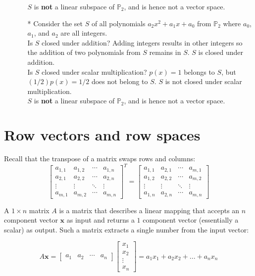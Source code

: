\documentclass{article}
\begin{document}
\begin{itemize}
\begin{itemize}
\(S\) is {\bf not} a linear subspace of \(\mathbb{P}_2\), and is hence not a vector space. 
\item[*] Consider the set \(S\) of all polynomials \(a_2 x^2 + a_1 x + a_0\) from \(\mathbb{P}_2\) where \(a_0\), \(a_1\), and \(a_2\) are all integers. \\
Is \(S\) closed under addition? Adding integers results in other integers so the addition of two polynomials from \(S\) remains in \(S\). \(S\) is closed under addition. \\
Is \(S\) closed under scalar multiplication? \(p(x) = 1\) belongs to \(S\), but \((1/2)p(x) = 1/2\) does not belong to \(S\). \(S\) is not closed under scalar multiplication. \\
\(S\) is {\bf not} a linear subspace of \(\mathbb{P}_2\), and is hence not a vector space. 
\end{itemize}
\end{itemize}




\section*{Row vectors and row spaces}

Recall that the transpose of a matrix swaps rows and columns: 
\[\begin{bmatrix}
a_{1,1} & a_{1,2} & \cdots & a_{1,n} \\
a_{2,1} & a_{2,2} & \cdots & a_{2,n} \\
\vdots & \vdots & \ddots & \vdots \\
a_{m,1} & a_{m,2} & \cdots & a_{m,n} 
\end{bmatrix}^T = \begin{bmatrix}
a_{1,1} & a_{2,1} & \cdots & a_{m,1} \\
a_{1,2} & a_{2,2} & \cdots & a_{m,2} \\
\vdots & \vdots & \ddots & \vdots \\
a_{1,n} & a_{2,n} & \cdots & a_{m,n} 
\end{bmatrix}\]

A \(1 \times n\) matrix \(A\) is a matrix that describes a linear mapping that accepts an \(n\) component vector \(\mathbf{x}\) as input and returns a \(1\) component vector (essentially a scalar) as output. Such a matrix extracts a single number from the input vector:

\[A\mathbf{x} = \begin{bmatrix}
a_1 & a_2 & \cdots & a_n 
\end{bmatrix}\begin{bmatrix} 
x_1 \\ x_2 \\ \vdots \\ x_n 
\end{bmatrix} = a_1 x_1 + a_2 x_2 + ... + a_n x_n \]
\end{document}
